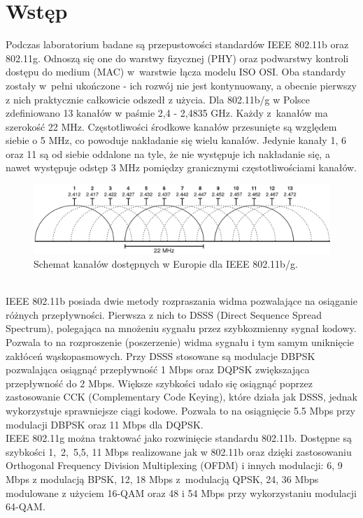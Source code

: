 \documentclass[12pt, a4paper, oneside]{article}
\begin{document}
\section{Wstęp}
\indent\indent Podczas laboratorium badane są przepustowości standardów IEEE 802.11b oraz 802.11g. Odnoszą się one do warstwy fizycznej (PHY) oraz podwarstwy kontroli dostępu do medium (MAC) w~warstwie łącza modelu ISO OSI. Oba standardy zostały w~pełni ukończone - ich rozwój nie jest kontynuowany, a obecnie pierwszy z nich praktycznie całkowicie odszedł z użycia. Dla 802.11b/g w Polsce zdefiniowano 13 kanałów w paśmie 2,4 - 2,4835 GHz. Każdy z~kanałów ma szerokość 22 MHz. Częstotliwości środkowe kanałów przesunięte są względem siebie o 5 MHz, co powoduje nakładanie się wielu kanałów. Jedynie kanały 1, 6 oraz 11 są od siebie oddalone na tyle, że nie występuje ich nakładanie się, a nawet występuje odstęp 3 MHz pomiędzy granicznymi częstotliwościami kanałów.\\
\begin{figure}[h!]
\centering
\includegraphics[scale=0.45]{pics/f2.png}
\caption{Schemat kanałów dostępnych w Europie dla IEEE 802.11b/g.}
\end{figure}\\
\indent IEEE 802.11b posiada dwie metody rozpraszania widma pozwalające na osiąganie różnych przepływności. Pierwsza z nich to DSSS (Direct Sequence Spread Spectrum), polegająca na mnożeniu sygnału przez szybkozmienny sygnał kodowy. Pozwala to na rozproszenie (poszerzenie) widma sygnału i tym samym uniknięcie zakłóceń wąskopasmowych. Przy DSSS stosowane są modulacje DBPSK pozwalająca osiągnąć przepływność 1 Mbps oraz DQPSK zwiększająca przepływność do 2 Mbps. Większe szybkości udało się osiągnąć poprzez zastosowanie CCK (Complementary Code Keying), które działa jak DSSS, jednak wykorzystuje sprawniejsze ciągi kodowe. Pozwala to na osiągnięcie 5.5 Mbps przy modulacji DBPSK oraz 11 Mbps dla DQPSK.\\
\indent IEEE 802.11g można traktować jako rozwinięcie standardu 802.11b. Dostępne są szybkości 1,~2,~5,5, 11 Mbps realizowane jak w 802.11b oraz dzięki zastosowaniu Orthogonal Frequency Division Multiplexing (OFDM) i innych modulacji: 6, 9 Mbps z modulacją BPSK, 12, 18 Mbps z~modulacją QPSK, 24, 36 Mbps modulowane z użyciem 16-QAM oraz 48 i 54 Mbps przy wykorzystaniu modulacji 64-QAM.\\
\end{document}
